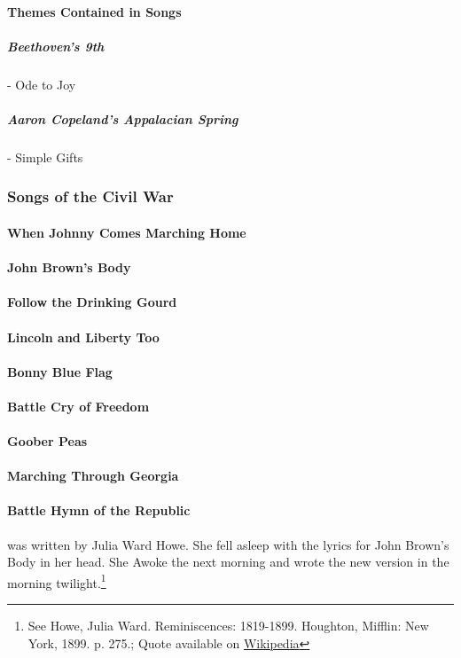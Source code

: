 				
				\paragraph{Themes Contained in Songs}
				
					\subparagraph {Beethoven's 9th} -  Ode to Joy
					\subparagraph{Aaron Copeland's Appalacian Spring} - Simple Gifts
				
			
			\newpage
			\subsubsection{Songs of the Civil War}
			\label{CivilWarSongs}
				\paragraph{When Johnny Comes Marching Home}
				\paragraph{John Brown's Body}
				\paragraph {Follow the Drinking Gourd}
				\paragraph{Lincoln and Liberty Too}
				\paragraph{Bonny Blue Flag}
				\paragraph{Battle Cry of Freedom}
				\paragraph{Goober Peas}
				\paragraph{Marching Through Georgia}
				\paragraph{Battle Hymn of the Republic} was written by Julia Ward Howe.  She fell asleep with the lyrics for John Brown's Body in her head.  She Awoke the next morning and wrote the new version in the morning twilight.\footnote{See Howe, Julia Ward. Reminiscences: 1819-1899. Houghton, Mifflin: New York, 1899. p. 275.; Quote available on \href{https://en.wikipedia.org/wiki/Battle_Hymn_of_the_Republic\#Creation_of_the_"Battle_Hymn"}{Wikipedia}}
				
